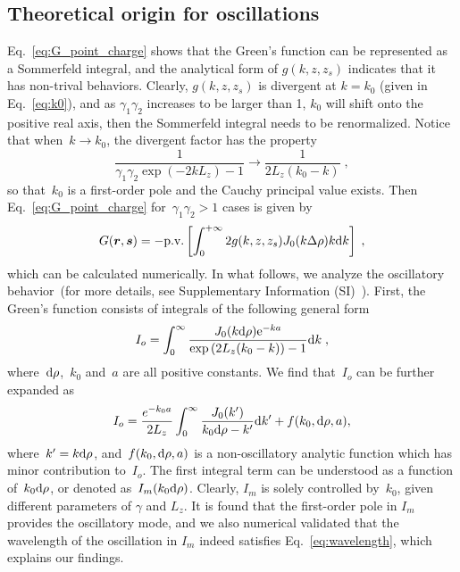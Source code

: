 \subsection{Theoretical origin for oscillations}

Eq.~\eqref{eq:G_point_charge} shows that the Green's function can be represented as a Sommerfeld integral, and the analytical form of $g(k, z, z_s)$ indicates that it has non-trival behaviors.
Clearly, $g(k, z, z_s)$ is divergent at $k=k_0$ (given in Eq.~\eqref{eq:k0}), and as $\gamma_1\gamma_2$ increases to be larger than 1, $k_0$ will shift onto the positive real axis, then the Sommerfeld integral needs to be renormalized.
Notice that when~$k \to k_0$, the divergent factor has the property
\begin{equation}
    \frac{1}{\gamma_1 \gamma_2 \exp{(-2 k L_z)} - 1} \to \frac{1}{2 L_z (k_0 - k)}\;,
\end{equation}
so that~$k_0$ is a first-order pole and the Cauchy principal value exists.
Then Eq.~\eqref{eq:G_point_charge} for~$\gamma_1 \gamma_2 > 1$ cases is given by
\begin{equation}\label{eq:G_pv}
    G(\boldsymbol{r}, \boldsymbol{s}) = - \text{p.v.} \left[ \int_{0}^{+\infty} 2 g(k, z, z_s) J_0(k \Delta \rho) k \text{d}k \right]  \;,
\end{equation}
which can be calculated numerically. In what follows, we analyze the oscillatory behavior~(for more details, see Supplementary Information (SI)~\cite{SI}). First, the Green's function consists of integrals of the following general form
\begin{equation}
    I_o = \int_0^{\infty} \frac{J_0(k \mathrm{d} \rho) \text{e}^{-ka}}{\exp{\left( 2 L_z (k_0 - k) \right)} - 1} \text{d}k\;,
\end{equation}
where~$\mathrm{d} \rho$,~$k_0$ and~$a$ are all positive constants.
We find that~$I_o$ can be further expanded as
\begin{equation}
    I_{o} = \frac{e^{-k_0 a}}{2L_z} \int_0^{\infty} \frac{J_0(k^\prime)}{k_0 \mathrm{d} \rho - k^\prime} \text{d}k^\prime + f(k_0, \mathrm{d} \rho, a),
\end{equation}
where~$k^\prime = k \mathrm{d} \rho$, and~$f(k_0, \mathrm{d} \rho, a)$ is a non-oscillatory analytic function which has minor contribution to~$I_o$.
The first integral term can be understood as a function of~$k_0 \mathrm{d} \rho$, or denoted as~$I_{m} (k_0 \mathrm{d} \rho)$. Clearly, $I_{m}$ is solely controlled by~$k_0$, given different parameters of $\gamma$ and $L_z$.
It is found that the first-order pole in $I_{m}$ provides the oscillatory mode, and we also numerical validated that the wavelength of the oscillation in $I_{m}$ indeed satisfies Eq.~\eqref{eq:wavelength}, which explains our findings.


